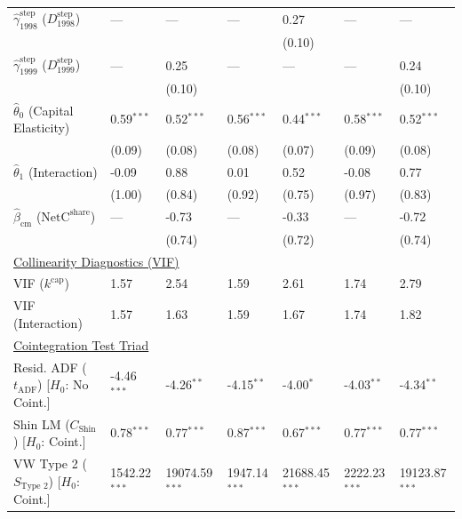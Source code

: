 \begin{table}[H]
\begin{tabular}{p{3.8cm}p{1.35cm}p{1.35cm}p{1.35cm}p{1.35cm}p{1.35cm}p{1.35cm}}
$\hat{\gamma}^{\text{step}}_{1998}$ ($D^{\text{step}}_{1998}$)  & --- & --- & --- & 0.27 & --- & ---  \\
 &  &  &  & {\scriptsize (0.10)} &  &   \\
$\hat{\gamma}^{\text{step}}_{1999}$ ($D^{\text{step}}_{1999}$)  & --- & 0.25 & --- & --- & --- & 0.24  \\
 &  & {\scriptsize (0.10)} &  &  &  & {\scriptsize (0.10)}  \\
[1ex]
$\hat{\theta}_0$ (Capital Elasticity)  & 0.59$^{***}$ & 0.52$^{***}$ & 0.56$^{***}$ & 0.44$^{***}$ & 0.58$^{***}$ & 0.52$^{***}$  \\
 & {\scriptsize (0.09)} & {\scriptsize (0.08)} & {\scriptsize (0.08)} & {\scriptsize (0.07)} & {\scriptsize (0.09)} & {\scriptsize (0.08)}  \\
$\hat{\theta}_1$ (Interaction)  & -0.09 & 0.88 & 0.01 & 0.52 & -0.08 & 0.77  \\
 & {\scriptsize (1.00)} & {\scriptsize (0.84)} & {\scriptsize (0.92)} & {\scriptsize (0.75)} & {\scriptsize (0.97)} & {\scriptsize (0.83)}  \\
$\hat{\beta}_{\text{cm}}$ ($\text{NetC}^{\text{share}}$)  & --- & -0.73 & --- & -0.33 & --- & -0.72  \\
 &  & {\scriptsize (0.74)} &  & {\scriptsize (0.72)} &  & {\scriptsize (0.74)}  \\
\midrule
\multicolumn{7}{l}{\underline{Collinearity Diagnostics (VIF)}} \\
VIF ($k^{\text{cap}}$) & 1.57 & 2.54 & 1.59 & 2.61 & 1.74 & 2.79  \\
VIF (Interaction) & 1.57 & 1.63 & 1.59 & 1.67 & 1.74 & 1.82  \\
\midrule
\multicolumn{7}{l}{\underline{Cointegration Test Triad}} \\
\makecell[l]{Resid. ADF ($t_{\text{ADF}}$) \\ {\scriptsize [$H_0$: No Coint.]}} & -4.46$^{***}$ & -4.26$^{**}$ & -4.15$^{**}$ & -4.00$^{*}$ & -4.03$^{**}$ & -4.34$^{**}$  \\
\makecell[l]{Shin LM ($C_{\text{Shin}}$) \\ {\scriptsize [$H_0$: Coint.]}} & 0.78$^{***}$ & 0.77$^{***}$ & 0.87$^{***}$ & 0.67$^{***}$ & 0.77$^{***}$ & 0.77$^{***}$  \\
\makecell[l]{VW Type 2 ($S_{\text{Type 2}}$) \\ {\scriptsize [$H_0$: Coint.]}} & 1542.22$^{***}$ & 19074.59$^{***}$ & 1947.14$^{***}$ & 21688.45$^{***}$ & 2222.23$^{***}$ & 19123.87$^{***}$  \\

\end{tabular}
\end{table}
